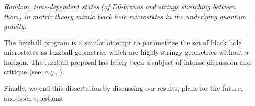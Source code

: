 \textit{
  Random, time-dependent states (of D0-branes and strings stretching between them) in matrix theory mimic black hole microstates in the underlying quantum gravity.
}

The fuzzball program \cite{Mathur:2005zp} is a similar attempt to parametrize the set of black hole microstates as fuzzball geometries which are highly stringy geometries without a horizon. The fuzzball proposal has lately been a subject of intense discussion and critique (see, e.g., \cite{Raju:2018xue}).
  
Finally, we end this dissertation by discussing our results, plans for the future, and open questions.